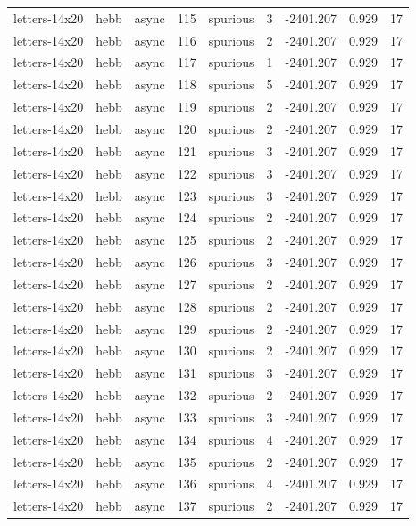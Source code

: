 \begin{tabular}{lllrlrrrr}
letters-14x20 & hebb & async & 115 & spurious & 3 & -2401.207 & 0.929 & 17 \\
letters-14x20 & hebb & async & 116 & spurious & 2 & -2401.207 & 0.929 & 17 \\
letters-14x20 & hebb & async & 117 & spurious & 1 & -2401.207 & 0.929 & 17 \\
letters-14x20 & hebb & async & 118 & spurious & 5 & -2401.207 & 0.929 & 17 \\
letters-14x20 & hebb & async & 119 & spurious & 2 & -2401.207 & 0.929 & 17 \\
letters-14x20 & hebb & async & 120 & spurious & 2 & -2401.207 & 0.929 & 17 \\
letters-14x20 & hebb & async & 121 & spurious & 3 & -2401.207 & 0.929 & 17 \\
letters-14x20 & hebb & async & 122 & spurious & 3 & -2401.207 & 0.929 & 17 \\
letters-14x20 & hebb & async & 123 & spurious & 3 & -2401.207 & 0.929 & 17 \\
letters-14x20 & hebb & async & 124 & spurious & 2 & -2401.207 & 0.929 & 17 \\
letters-14x20 & hebb & async & 125 & spurious & 2 & -2401.207 & 0.929 & 17 \\
letters-14x20 & hebb & async & 126 & spurious & 3 & -2401.207 & 0.929 & 17 \\
letters-14x20 & hebb & async & 127 & spurious & 2 & -2401.207 & 0.929 & 17 \\
letters-14x20 & hebb & async & 128 & spurious & 2 & -2401.207 & 0.929 & 17 \\
letters-14x20 & hebb & async & 129 & spurious & 2 & -2401.207 & 0.929 & 17 \\
letters-14x20 & hebb & async & 130 & spurious & 2 & -2401.207 & 0.929 & 17 \\
letters-14x20 & hebb & async & 131 & spurious & 3 & -2401.207 & 0.929 & 17 \\
letters-14x20 & hebb & async & 132 & spurious & 2 & -2401.207 & 0.929 & 17 \\
letters-14x20 & hebb & async & 133 & spurious & 3 & -2401.207 & 0.929 & 17 \\
letters-14x20 & hebb & async & 134 & spurious & 4 & -2401.207 & 0.929 & 17 \\
letters-14x20 & hebb & async & 135 & spurious & 2 & -2401.207 & 0.929 & 17 \\
letters-14x20 & hebb & async & 136 & spurious & 4 & -2401.207 & 0.929 & 17 \\
letters-14x20 & hebb & async & 137 & spurious & 2 & -2401.207 & 0.929 & 17 \\

\end{tabular}
